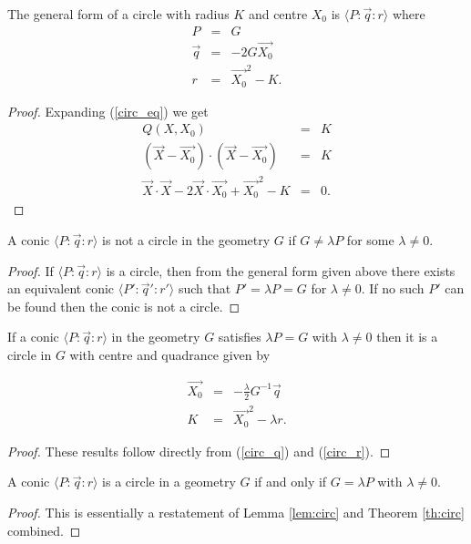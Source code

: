 \begin{theorem}
The general form of a circle with radius $K$ and centre $X_0$ is $\langle P\!:\!\vec{q}\!:\!r \rangle$ where
\begin{eqnarray}
P & = & G\\
\vec{q} & = & -2G\vec{X_0}\label{circ_q}\\
r & = & \vec{X_0}^2 - K.\label{circ_r}
\end{eqnarray}
\end{theorem}
\begin{proof}
Expanding (\ref{circ_eq}) we get
\begin{eqnarray}
Q(X, X_0) & = & K\nonumber\\
(\vec{X} - \vec{X_0})\cdot(\vec{X} - \vec{X_0}) & = & K\nonumber\\
\vec{X}\cdot\vec{X} - 2\vec{X}\cdot\vec{X_0} + \vec{X_0}^2 -K & = & 0.\nonumber
\end{eqnarray}
\end{proof}

\begin{lemma}\label{lem:circ}
A conic $\langle P\!:\!\vec{q}\!:\!r \rangle$ is not a circle in the geometry $G$ if $G \neq \lambda P$ for some $\lambda \neq 0$.
\end{lemma}
\begin{proof}
If $\langle P\!:\!\vec{q}\!:\!r \rangle$ is a circle, then from the general form given above there exists an equivalent conic $\langle P'\!:\!\vec{q}'\!:\!r' \rangle$ such that $P' = \lambda P = G$ for $\lambda \neq 0$. If no such $P'$ can be found then the conic is not a circle.
\end{proof}

\begin{theorem}\label{th:circ}
If a conic $\langle P\!:\!\vec{q}\!:\!r \rangle$ in the geometry $G$ satisfies $\lambda P = G$ with $\lambda \neq 0$ then it is a circle in $G$ with centre and quadrance given by

\begin{eqnarray}
\vec{X_0} & = & -\frac{\lambda}{2}G^{-1}\vec{q}\\
K & = & \vec{X_0}^2 - \lambda r.
\end{eqnarray}

\end{theorem}
\begin{proof}
These results follow directly from (\ref{circ_q}) and (\ref{circ_r}).
\end{proof}

\begin{corollary}
A conic $\langle P\!:\!\vec{q}\!:\!r \rangle$ is a circle in a geometry $G$ if and only if $G = \lambda P$ with $\lambda \neq 0$.
\end{corollary}
\begin{proof}
This is essentially a restatement of Lemma \ref{lem:circ} and Theorem \ref{th:circ} combined.
\end{proof}


